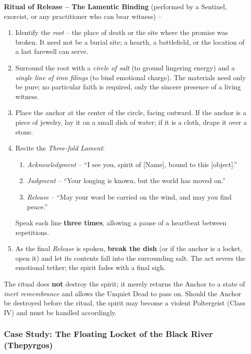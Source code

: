\textbf{Ritual of Release -- The Lamentic Binding} (performed by a Sentinel, exorcist, or any practitioner who can bear witness) --  
\begin{enumerate}
  \item Identify the \textit{root} -- the place of death or the site where the promise was broken. It need not be a burial site; a hearth, a battlefield, or the location of a last farewell can serve.
  \item Surround the root with a \textit{circle of salt} (to ground lingering energy) and a \textit{single line of iron filings} (to bind emotional charge). The materials need only be pure; no particular faith is required, only the sincere presence of a living witness.
  \item Place the anchor at the center of the circle, facing outward. If the anchor is a piece of jewelry, lay it on a small dish of water; if it is a cloth, drape it over a stone.
  \item Recite the \textit{Three-fold Lament}:  
  \begin{enumerate}
    \item \textit{Acknowledgment} -- ``I see you, spirit of [Name], bound to this [object].''
    \item \textit{Judgment} -- ``Your longing is known, but the world has moved on.''
    \item \textit{Release} -- ``May your word be carried on the wind, and may you find peace.''
  \end{enumerate}
  Speak each line \textbf{three times}, allowing a pause of a heartbeat between repetitions.
  \item As the final \textit{Release} is spoken, \textbf{break the dish} (or if the anchor is a locket, open it) and let its contents fall into the surrounding salt. The act severs the emotional tether; the spirit fades with a final sigh.
\end{enumerate}
The ritual does \textbf{not} destroy the spirit; it merely returns the Anchor to a state of \textit{inert remembrance} and allows the Unquiet Dead to pass on. Should the Anchor be destroyed before the ritual, the spirit may become a violent Poltergeist (Class IV) and must be handled accordingly.

\subsubsection*{Case Study: The Floating Locket of the Black River (Thepyrgos)}

